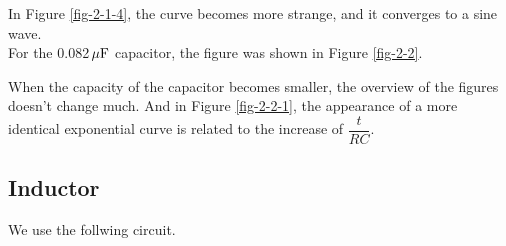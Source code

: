 \documentclass{article}
\newcommand{\unit}[1]{{\rm\,#1}}
\begin{document}
In Figure \ref{fig-2-1-4}, the curve becomes more strange, and it converges to a sine wave. \\


For the 0.082$\unit{\mu F}$ capacitor, the figure was shown in Figure \ref{fig-2-2}.


When the capacity of the capacitor becomes smaller, the overview of the figures doesn't change much. And in Figure \ref{fig-2-2-1}, the appearance of a more identical exponential curve is related to the increase of $\dfrac{t}{RC}$.

\newpage

\subsection{Inductor}

We use the follwing circuit.

\begin{center}
\end{center}

\end{document}
